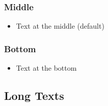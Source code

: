 \documentclass[usepdftitle=false,professionalfonts,compress ]{beamer}
\begin{document}
{
\begin{frame}\frametitle{Middle}


	\begin{itemize}

	\item Text at the middle (default)

				\end{itemize}

\end{frame}
}



{
\begin{frame}[b]\frametitle{Bottom}


	\begin{itemize}

	\item Text at the bottom

				\end{itemize}

\end{frame}
}




\subsection{Long Texts}
\end{document}
